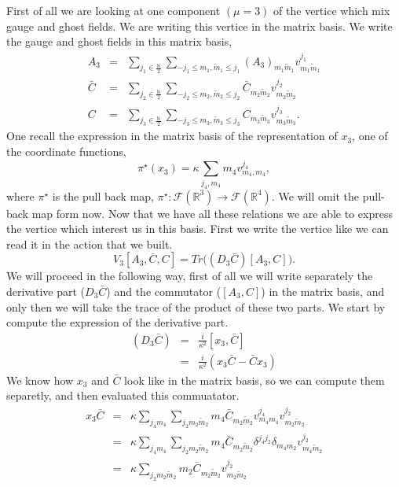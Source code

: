 \documentclass[a4paper,11pt]{article} %
\numberwithin{equation}{section} %
\numberwithin{figure}{section} %
\theoremstyle{plain} %
\theoremstyle{definition} %
\theoremstyle{remark} %
\begin{document}
\noindent
First of all we are looking at one component $(\mu=3)$ of the vertice which mix gauge and ghost fields. We are writing this vertice in the matrix basis.
We write the gauge and ghost fields in this matrix basis,
\begin{eqnarray*}
 A_3    &=&   \sum_{j_1 \in \frac{\mathbb{N}}{2} } \sum_{ -j_1 \leq m_1 , \tilde{m}_1 \leq j_1 } ( A_3 )_{m_1 \tilde{m}_1 } v^{j_1}_{m_1 \tilde{m}_1} \\
 \bar{C}  &=&   \sum_{j_2 \in \frac{\mathbb{N}}{2} } \sum_{ -j_2 \leq m_2 , \tilde{m}_2 \leq j_2 } \bar{C}_{m_2 \tilde{m}_2 } v^{j_2}_{m_2 \tilde{m}_2} \\
 C        &=&   \sum_{j_3 \in \frac{\mathbb{N}}{2} } \sum_{ -j_3 \leq m_3 , \tilde{m}_3 \leq j_3 } C_{m_3 \tilde{m}_3 } v^{j_3}_{m_3 \tilde{m}_3}.  
\end{eqnarray*}
One recall the expression in the matrix basis of the representation of $x_3$, one of the coordinate functions,
\begin{equation*}
 \pi^{\star}(x_3) = \kappa \sum_{j_4, m_4} m_4 v^{j_4}_{m_4,m_4},
\end{equation*}
where $\pi^{\star}$ is the pull back map, $\pi^{\star} : \mathcal{F}(\mathbb{R}^3) \rightarrow \mathcal{F}(\mathbb{R}^4)$. We will omit the pull-back map form now. Now that we have all these relations we are able to express the vertice which interest us in this basis. First we write the vertice like we can read it in the action that we built.
\begin{equation*}
 V_3 [A_3, \bar{C}, C] = Tr \big( (D_3 \bar{C}) [A_3,C] \big). 
\end{equation*}
We will proceed in the following way, first of all we will write separately the derivative part ($D_3 \bar{C}$) and the commutator ($[A_3, C]$) in the matrix basis, and only then we will take the trace of the product of these two parts. We start by compute the expression of the derivative part.
\begin{eqnarray*}
 (D_3 \bar{C}) &=& \frac{i}{\kappa^2} [x_3,\bar{C}] \\
               &=& \frac{i}{\kappa^2} (x_3\bar{C}-\bar{C}x_3) 
\end{eqnarray*}
We know how $x_3$ and $\bar{C}$ look like in the matrix basis, so we can compute them separetly, and then evaluated this commuatator.
\begin{eqnarray*}
 x_3\bar{C} &=& \kappa \sum_{j_4 m_4} \sum_{j_2 m_2 \tilde{m}_2} m_4 \bar{C}_{m_2 \tilde{m}_2} v^{j_4}_{m_4 m_4} v^{j_2}_{m_2 \tilde{m}_2} \\
            &=& \kappa \sum_{j_4 m_4} \sum_{j_2 m_2 \tilde{m}_2} m_4 \bar{C}_{m_2 \tilde{m}_2} \delta^{j_4 j_2} \delta_{m_4 m_2} v^{j_2}_{m_4 \tilde{m}_2} \\
            &=& \kappa \sum_{j_2 m_2 \tilde{m}_2} m_2 \bar{C}_{m_2 \tilde{m}_2} v^{j_2}_{m_2 \tilde{m}_2}
\end{eqnarray*}
\end{document}
